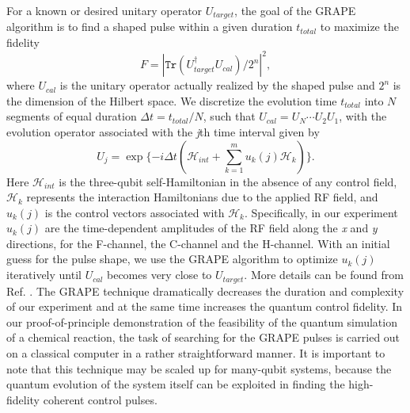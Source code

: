 \documentclass[twocolumn,showpacs,twoside,10pt,prl]{revtex4}
\begin{document}
For a known or desired unitary operator $U_{target}$,
the goal of the GRAPE algorithm is to find a shaped pulse within a given duration $t_{total}$ to maximize the fidelity
\begin{equation}\label{grape_fid}
F =|\texttt{Tr}(U_{target}^{\dagger}U_{cal})/2^n|^2,
\end{equation}
where $U_{cal}$ is the unitary operator actually realized by the shaped pulse and $2^n$ is the dimension of the Hilbert space. We discretize the evolution time $t_{total}$ into $N$ segments of equal duration $\Delta t = t_{total}/N$, such that $U_{cal}=U_N\cdots U_2U_1$, with the evolution operator associated with the \emph{j}th time interval given by
\begin{equation}
U_j=\exp\{-i\Delta t(\mathcal{H}_{int}+\sum_{k=1}^m u_k(j)\mathcal{H}_{k})\}.
\end{equation}
Here $\mathcal{H}_{int}$ is the three-qubit self-Hamiltonian in the absence of any control field, $\mathcal{H}_{k}$ represents the interaction Hamiltonians due to the applied RF field, and $u_k(j)$ is the control vectors associated with $\mathcal{H}_{k}$. Specifically, in our experiment $u_k(j)$ are the time-dependent amplitudes of the RF field along the \emph{x} and \emph{y} directions, for the F-channel, the C-channel and the H-channel.  With an initial guess for the pulse shape, we use the GRAPE algorithm to optimize $u_k(j)$ iteratively until $U_{cal}$ becomes very close to $U_{target}$.  More details can be found from Ref. \cite{grape1-2}. The GRAPE technique dramatically decreases the duration and complexity of our experiment and at the same time increases the quantum control fidelity.  In our proof-of-principle demonstration of the feasibility of the quantum simulation of a chemical reaction, the task of searching for the GRAPE pulses is carried out on a classical computer in a rather straightforward manner. It is important to note that this technique may be scaled up for many-qubit systems, because the quantum evolution of the system itself can be exploited in finding the high-fidelity coherent control pulses.
\end{document}
